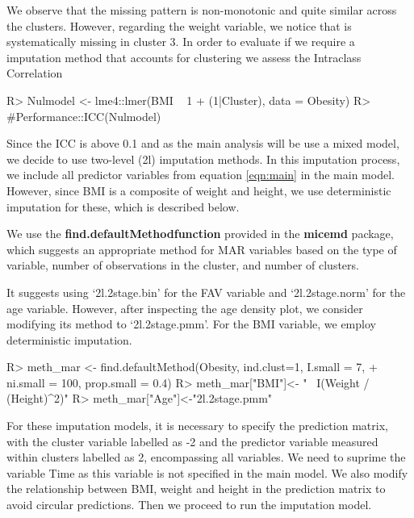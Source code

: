 \documentclass[
]{jss}
\begin{document}
We observe that the missing pattern is non-monotonic and quite similar
across the clusters. However, regarding the weight variable, we notice
that is systematically missing in cluster 3. In order to evaluate if we
require a imputation method that accounts for clustering we assess the
Intraclass Correlation

\begin{CodeChunk}
\begin{CodeInput}
R> Nulmodel <- lme4::lmer(BMI ~ 1 + (1|Cluster), data = Obesity)
R> #Performance::ICC(Nulmodel)
\end{CodeInput}
\end{CodeChunk}

Since the ICC is above 0.1 and as the main analysis will be use a mixed
model, we decide to use two-level (2l) imputation methods. In this
imputation process, we include all predictor variables from equation
\ref{eqn:main} in the main model. However, since BMI is a composite of
weight and height, we use deterministic imputation for these, which is
described below.

We use the \textbf{find.defaultMethodfunction} provided in the
\textbf{micemd} package, which suggests an appropriate method for MAR
variables based on the type of variable, number of observations in the
cluster, and number of clusters.

It suggests using `2l.2stage.bin' for the FAV variable and
`2l.2stage.norm' for the age variable. However, after inspecting the age
density plot, we consider modifying its method to `2l.2stage.pmm'. For
the BMI variable, we employ deterministic imputation.

\begin{CodeChunk}
\begin{CodeInput}
R> meth_mar <- find.defaultMethod(Obesity, ind.clust=1, I.small = 7,
+                                ni.small = 100, prop.small = 0.4)
R> meth_mar["BMI"]<- "~ I(Weight / (Height)^2)"
R> meth_mar["Age"]<-"2l.2stage.pmm" 
\end{CodeInput}
\end{CodeChunk}

For these imputation models, it is necessary to specify the prediction
matrix, with the cluster variable labelled as -2 and the predictor
variable measured within clusters labelled as 2, encompassing all
variables. We need to suprime the variable Time as this variable is not
specified in the main model. We also modify the relationship between
BMI, weight and height in the prediction matrix to avoid circular
predictions. Then we proceed to run the imputation model.
\end{document}
